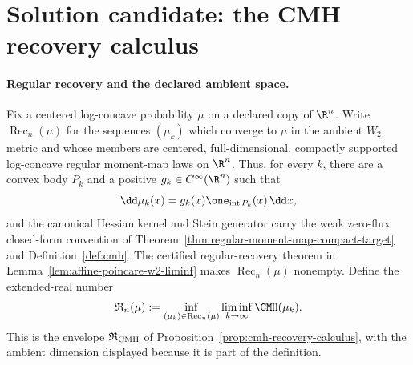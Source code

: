 \documentclass[../main.tex]{subfiles}
\begin{document}
%
\section*{Solution candidate: the CMH recovery calculus}
\label{sec:sol-cmh-recovery-calculus}

\paragraph{Regular recovery and the declared ambient space.}
Fix a centered log-concave probability $\mu$ on a declared copy of $\R^n$.  Write
$\operatorname{Rec}_n(\mu)$ for the sequences $(\mu_k)$ which converge to $\mu$ in the
ambient $W_2$ metric and whose members are centered, full-dimensional, compactly supported
log-concave regular moment-map laws on $\R^n$.  Thus, for every $k$, there are a convex body
$P_k$ and a positive $g_k\in C^\infty(\R^n)$ such that
\[
  \dd\mu_k(x)=g_k(x)\one_{\operatorname{int}P_k}(x)\,\dd x,
\]
and the canonical Hessian kernel and Stein generator carry the weak zero-flux closed-form
convention of Theorem~\ref{thm:regular-moment-map-compact-target} and
Definition~\ref{def:cmh}.  The certified regular-recovery theorem in
Lemma~\ref{lem:affine-poincare-w2-liminf} makes $\operatorname{Rec}_n(\mu)$ nonempty.  Define
the extended-real number
\begin{equation}
  \mathfrak R_n(\mu)
  :=\inf_{(\mu_k)\in\operatorname{Rec}_n(\mu)}
       \liminf_{k\to\infty}\CMH(\mu_k).
  \label{eq:sol-cmh-recovery-envelope}
\end{equation}
This is the envelope $\mathfrak R_{\rm CMH}$ of
Proposition~\ref{prop:cmh-recovery-calculus}, with the ambient dimension displayed because it
is part of the definition.
\end{document}
